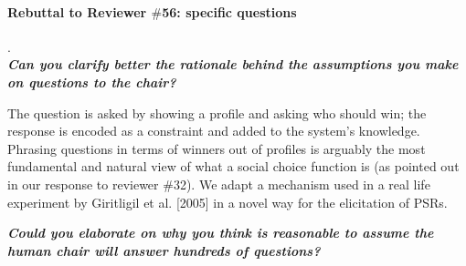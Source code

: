 \documentclass{article}
\begin{document}
\paragraph{Rebuttal to Reviewer $\#$56: specific questions}.\\
\textit{\textbf{Can you clarify better the rationale behind the assumptions you make on questions to the chair?}}

The question is asked by showing a profile and asking who should win; the response is encoded as a constraint and added to the system’s knowledge. Phrasing questions in terms of winners out of profiles is arguably the most fundamental and natural view of what a social choice function is (as pointed out in our response to reviewer $\#$32). We adapt a mechanism used in a real life experiment by Giritligil et al. [2005] in a novel way for the elicitation of PSRs.

\textit{\textbf{Could you elaborate on why you think is reasonable to assume the human chair will answer hundreds of questions?}}
\end{document}
